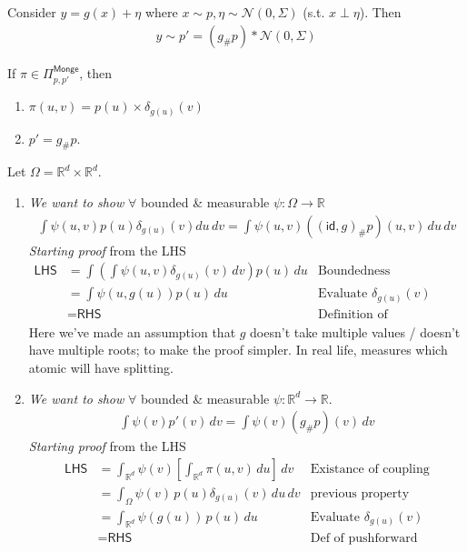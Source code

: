 \documentclass[11pt,fleqn]{article}
\numberwithin{equation}{section}
\theoremstyle{definition}
\theoremstyle{definition}
\renewenvironment{proof}[1][\proofname]{\vspace{-10pt}\begin{replacementproof}}{\end{replacementproof}}
\begin{document}
\begin{eg}
	Consider $y = g(x) + \eta$ where $x \sim p, \eta \sim \mathcal N(0, \Sigma)$ (s.t. $x \perp \eta$). Then
	\begin{align}
		y \sim p' = (g_\# p) * \mathcal N(0, \Sigma)
	\end{align}
\end{eg}
\begin{lemma}
	If $\pi \in \Pi_{p,p'}^{\textsf{Monge}}$, then 
	\begin{enumerate}
		\item $\pi(u,v) = p(u) \times \delta_{g(u)}(v)$
		\item $p' = g_\# p$.
	\end{enumerate}
\end{lemma}
\begin{proof}
	Let $\Omega = \mathbb R^d \times \mathbb R^d$. 
	\begin{enumerate}
		\item \emph{We want to show} $\forall$ bounded \& measurable $\psi : \Omega \to \mathbb R$
	\begin{align}
		\int \psi(u,v) p(u) \delta_{g(u)}(v) du\, dv = \int \psi(u,v) \left( (\textsf{id}, g)_\# p \right) (u,v) \, du \, dv
	\end{align}
	\emph{Starting proof} from the LHS
	\begin{align}
		\textsf{LHS} & = \int \left( \int \psi(u,v) \delta_{g(u)}(v) \, dv \right) p(u) \, du & \text{Boundedness}\\
		& = \int \psi(u, g(u)) p(u) \, du & \text{Evaluate } \delta_{g(u)}(v)\\
		& = \textsf{RHS} & \text{Definition of pushforward}
	\end{align}
	Here we've made an assumption that $g$ doesn't take multiple values / doesn't have multiple roots; to make the proof simpler. In real life, measures which atomic will have splitting.
	
	\item \emph{We want to show} $\forall$ bounded \& measurable $\psi: \mathbb R^d \to \mathbb R$.
	\begin{align}
		\int \psi(v) p'(v) \, dv = \int \psi(v) (g_\#p)(v) \, dv
	\end{align}
	\emph{Starting proof} from the LHS
	\begin{align}
		\textsf{LHS} & = \int_{\mathbb R^d} \psi(v) \left[ \int_{\mathbb R^d} \pi(u,v) \, du \right] \, dv & \text{Existance of coupling}\\
		& = \int_{\Omega} \psi(v) \, p(u) \delta_{g(u)}(v) \, du \, dv & \text{previous property}\\
		& = \int_{\mathbb R^d} \psi(g(u)) \, p(u) \, du & \text{Evaluate } \delta_{g(u)}(v)\\
		& = \textsf{RHS} & \text{Def of pushforward}
	\end{align}
	\end{enumerate}
\end{proof}
\end{document}
